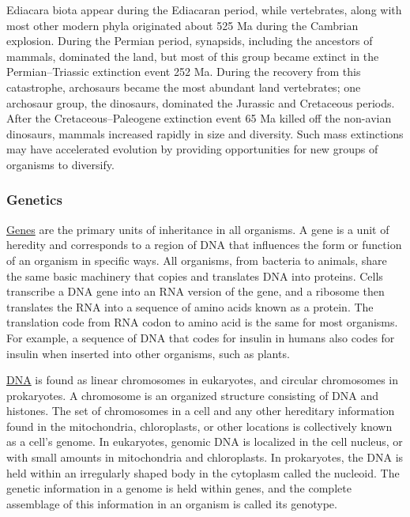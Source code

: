 \documentclass[
]{article}
\begin{document}
Ediacara biota appear during the Ediacaran period, while vertebrates,
along with most other modern phyla originated about 525 Ma during the
Cambrian explosion. During the Permian period, synapsids, including the
ancestors of mammals, dominated the land, but most of this group became
extinct in the Permian--Triassic extinction event 252 Ma. During the
recovery from this catastrophe, archosaurs became the most abundant land
vertebrates; one archosaur group, the dinosaurs, dominated the Jurassic
and Cretaceous periods. After the Cretaceous--Paleogene extinction event
65 Ma killed off the non-avian dinosaurs, mammals increased rapidly in
size and diversity. Such mass extinctions may have accelerated evolution
by providing opportunities for new groups of organisms to diversify.

\hypertarget{genetics}{%
\subsubsection{Genetics}\label{genetics}}

\href{https://en.wikipedia.org/wiki/Gene}{Genes} are the primary units
of inheritance in all organisms. A gene is a unit of heredity and
corresponds to a region of DNA that influences the form or function of
an organism in specific ways. All organisms, from bacteria to animals,
share the same basic machinery that copies and translates DNA into
proteins. Cells transcribe a DNA gene into an RNA version of the gene,
and a ribosome then translates the RNA into a sequence of amino acids
known as a protein. The translation code from RNA codon to amino acid is
the same for most organisms. For example, a sequence of DNA that codes
for insulin in humans also codes for insulin when inserted into other
organisms, such as plants.

\href{https://en.wikipedia.org/wiki/DNA}{DNA} is found as linear
chromosomes in eukaryotes, and circular chromosomes in prokaryotes. A
chromosome is an organized structure consisting of DNA and histones. The
set of chromosomes in a cell and any other hereditary information found
in the mitochondria, chloroplasts, or other locations is collectively
known as a cell's genome. In eukaryotes, genomic DNA is localized in the
cell nucleus, or with small amounts in mitochondria and chloroplasts. In
prokaryotes, the DNA is held within an irregularly shaped body in the
cytoplasm called the nucleoid. The genetic information in a genome is
held within genes, and the complete assemblage of this information in an
organism is called its genotype.
\end{document}
